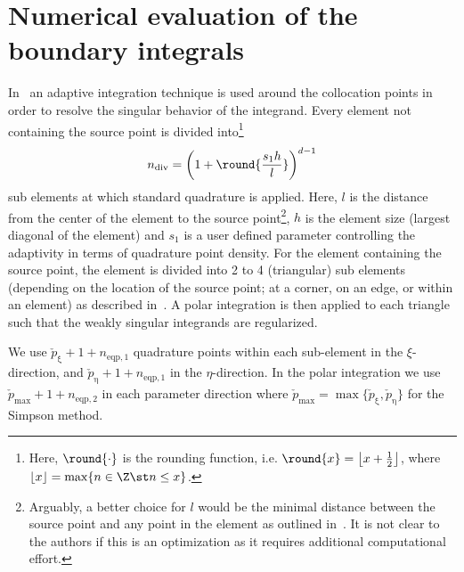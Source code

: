 \section{Numerical evaluation of the boundary integrals}
\label{Sec3:numericalQuad}
In~\cite[p. 286]{Simpson2014aib} an adaptive integration technique is used around the collocation points in order to resolve the singular behavior of the integrand. Every element not containing the source point is divided into\footnote{Here, $\round{\cdot}$ is the rounding function, i.e. $\round{x} = \left\lfloor x+\frac{1}{2}\right\rfloor$, where $\lfloor x\rfloor = \max\{n\in\Z\st n\leq x\}$.}
\begin{equation}\label{Eq3:numberOfSubElements}
	n_{\mathrm{div}} = \left(1+\round{\frac{s_1 h}{l}}\right)^{d-1}
\end{equation}
sub elements at which standard quadrature is applied. Here, $l$ is the distance from the center of the element to the source point\footnote{Arguably, a better choice for $l$ would be the minimal distance between the source point and any point in the element as outlined in~\cite{Taus2015iaf}. It is not clear to the authors if this is an optimization as it requires additional computational effort.}, $h$ is the element size (largest diagonal of the element) and $s_1$ is a user defined parameter controlling the adaptivity in terms of quadrature point density. For the element containing the source point, the element is divided into 2 to 4 (triangular) sub elements (depending on the location of the source point; at a corner, on an edge, or within an element) as described in~\cite{Scott2013ibe}. A polar integration is then applied to each triangle such that the weakly singular integrands are regularized.

We use $\check{p}_\upxi+1+n_{\mathrm{eqp},1}$ quadrature points within each sub-element in the $\xi$-direction, and $\check{p}_\upeta+1+n_{\mathrm{eqp},1}$ in the $\eta$-direction. In the polar integration we use $\check{p}_{\mathrm{max}}+1+n_{\mathrm{eqp},2}$ in each parameter direction where $\check{p}_{\mathrm{max}} = \max\{\check{p}_\upxi,\check{p}_\upeta\}$ for the Simpson method.


